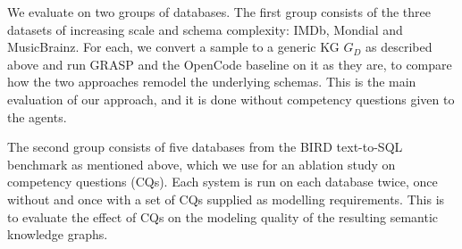 We evaluate on two groups of databases. The first group consists of the three datasets of increasing scale and schema complexity: IMDb, Mondial and MusicBrainz. For each, we convert a sample to a generic KG \(G_D\) as described above and run GRASP and the OpenCode baseline on it as they are, to compare how the two approaches remodel the underlying schemas. This is the main evaluation of our approach, and it is done without competency questions given to the agents.

The second group consists of five databases from the BIRD text-to-SQL benchmark as mentioned above, which we use for an ablation study on competency questions (CQs). Each system is run on each database twice, once without and once with a set of CQs supplied as modelling requirements. This is to evaluate the effect of CQs on the modeling quality of the resulting semantic knowledge graphs.


